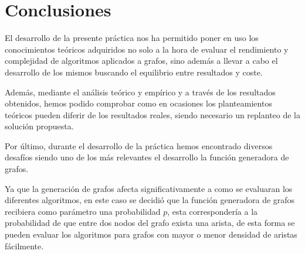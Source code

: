 \part{Conclusiones}
El desarrollo de la presente práctica nos ha permitido poner en uso los conocimientos teóricos adquiridos no solo a la hora de evaluar el rendimiento y complejidad de algoritmos aplicados a grafos, sino además a llevar a cabo el desarrollo de los mismos buscando el equilibrio entre resultados y coste.

Además, mediante el análisis teórico y empírico y a través de los resultados obtenidos, hemos podido comprobar como en ocasiones los planteamientos teóricos pueden diferir de los resultados reales, siendo necesario un replanteo de la solución propuesta.

Por último, durante el desarrollo de la práctica hemos encontrado diversos desafíos siendo uno de los más relevantes el desarrollo la función generadora de grafos.

Ya que la generación de grafos afecta significativamente a como se evaluaran los diferentes algoritmos, en este caso se decidió que la función generadora de grafos recibiera como parámetro una probabilidad $p$, esta correspondería a la probabilidad de que entre dos nodos del grafo exista una arista, de esta forma se pueden evaluar los algoritmos para grafos con mayor o menor densidad de aristas fácilmente.


